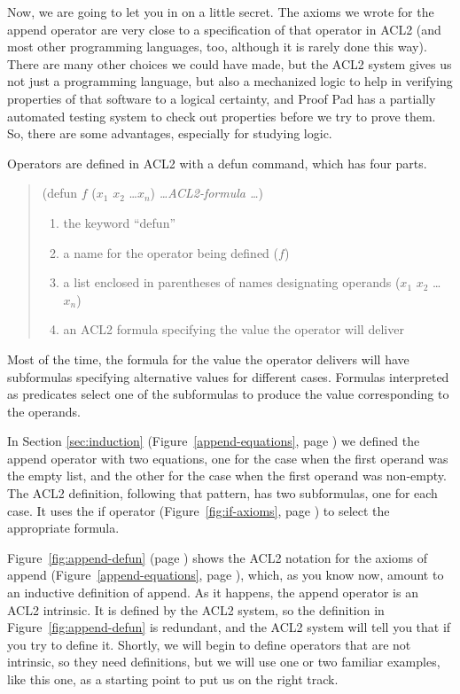 Now, we are going to let you in on a little secret.
The axioms we wrote for the append operator are very
close to a specification of that operator in ACL2
(and most other programming languages, too, although
it is rarely done this way).
There are many other choices we could have made,
but the ACL2 system gives us not just a programming language,
but also a mechanized logic to help in verifying properties of
that software to a logical certainty,
and Proof Pad has a partially automated testing system to
check out properties before we try to prove them.
So, there are some advantages, especially for studying logic.

Operators are defined in ACL2 with a defun command,
which has four parts.
\begin{quote}
(defun $f$ ($x_1$ $x_2$ \dots $x_n$) \emph{\dots ACL2-formula \dots})

\begin{enumerate}
\item the keyword ``defun''
\item a name for the operator being defined ($f$)
\item a list enclosed in parentheses of names designating operands ($x_1$ $x_2$ \dots $x_n$)
\item an ACL2 formula specifying the value the operator will deliver
\end{enumerate}
\end{quote}

Most of the time, the formula for the value the operator delivers
will have subformulas specifying alternative values for different cases.
Formulas interpreted as predicates select one of
the subformulas to produce the value corresponding to the operands.

In Section \ref{sec:induction} (Figure~\ref{append-equations}, page \pageref{append-equations})
we defined the append operator with two equations,
one for the case when the first operand was the empty list,
and the other for the case when the first operand was non-empty.
The ACL2 definition, following that pattern, has two subformulas,
one for each case.
It uses the if operator
(Figure~\ref{fig:if-axioms}, page \pageref{fig:if-axioms})
to select the appropriate formula.

Figure~\ref{fig:append-defun} (page \pageref{fig:append-defun})
shows the ACL2 notation for the axioms of append
(Figure~\ref{append-equations}, page \pageref{append-equations}),
which, as you know now, amount to an inductive definition of append.
As it happens, the append operator is an ACL2 intrinsic.
It is defined by the ACL2 system, so the definition
in Figure~\ref{fig:append-defun} is redundant,
and the ACL2 system will tell you that if you try to define it.
Shortly, we will begin to define operators that are not
intrinsic, so they need definitions,
but we will use one or two familiar examples, like this one,
as a starting point to put us on the right track.

